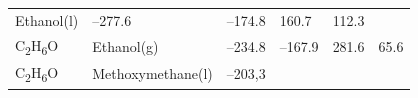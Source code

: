 \documentclass[
]{book}
\theoremstyle{definition}
\theoremstyle{definition}
\theoremstyle{definition}
\theoremstyle{remark}
\begin{document}
\begin{longtable}[]{@{}llllll@{}}
\begin{minipage}[t]{0.17\columnwidth}
Ethanol(l)\strut
\end{minipage} & \begin{minipage}[t]{0.15\columnwidth}\raggedright
--277.6\strut
\end{minipage} & \begin{minipage}[t]{0.15\columnwidth}\raggedright
--174.8\strut
\end{minipage} & \begin{minipage}[t]{0.14\columnwidth}\raggedright
160.7\strut
\end{minipage} & \begin{minipage}[t]{0.14\columnwidth}\raggedright
112.3\strut
\end{minipage}\tabularnewline
\begin{minipage}[t]{0.07\columnwidth}\raggedright
C\textsubscript{2}H\textsubscript{6}O\strut
\end{minipage} & \begin{minipage}[t]{0.17\columnwidth}\raggedright
Ethanol(g)\strut
\end{minipage} & \begin{minipage}[t]{0.15\columnwidth}\raggedright
--234.8\strut
\end{minipage} & \begin{minipage}[t]{0.15\columnwidth}\raggedright
--167.9\strut
\end{minipage} & \begin{minipage}[t]{0.14\columnwidth}\raggedright
281.6\strut
\end{minipage} & \begin{minipage}[t]{0.14\columnwidth}\raggedright
65.6\strut
\end{minipage}\tabularnewline
\begin{minipage}[t]{0.07\columnwidth}\raggedright
C\textsubscript{2}H\textsubscript{6}O\strut
\end{minipage} & \begin{minipage}[t]{0.17\columnwidth}\raggedright
Methoxymethane(l)\strut
\end{minipage} & \begin{minipage}[t]{0.15\columnwidth}\raggedright
--203,3\strut
\end{minipage} & \begin{minipage}[t]{0.15\columnwidth}\raggedright
\strut
\end{minipage} & \begin{minipage}[t]{0.14\columnwidth}\raggedright
\strut
\end{minipage} & \begin{minipage}[t]{0.14\columnwidth}\raggedright

\end{minipage}
\end{longtable}
\end{document}
